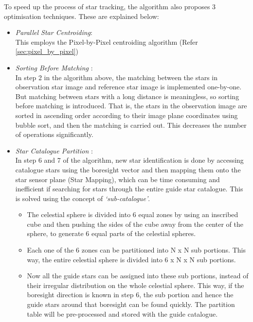 \documentclass[../../main.tex]{subfiles}
\begin{document}
To speed up the process of star tracking, the algorithm also proposes 3 optimisation techniques. These are explained below:
\begin{itemize}
    \item \textit{Parallel Star Centroiding}:\\
    This employs the Pixel-by-Pixel centroiding algorithm (Refer \ref{sec:pixel_by_pixel})
    
    \item \textit{Sorting Before Matching} \label{sorting_before_matching}:\\
    In step 2 in the algorithm above, the matching between the stars in observation star image and reference star image is implemented one-by-one. But matching between stars with a long distance is meaningless, so sorting before matching is introduced. That is, the stars in the observation image are sorted in ascending order according to their image plane coordinates using bubble sort, and then the matching is carried out. This decreases the number of operations significantly. 
    
    \item \textit{Star Catalogue Partition} \label{catalogue_partition}:\\
    In step 6 and 7 of the algorithm, new star identification is done by accessing catalogue stars using the boresight vector and then mapping them onto the star sensor plane (Star Mapping), which can be time consuming and inefficient if searching for stars through the entire guide star catalogue. This is solved using the concept of \textit{`sub-catalogue'}.
    \begin{itemize}
        \item The celestial sphere is divided into 6 equal zones by using an inscribed cube and then pushing the sides of the cube away from the center of the sphere, to generate 6 equal parts of the celestial spheres. 
        \item Each one of the 6 zones can be partitioned into N x N sub portions. This way, the entire celestial sphere is divided into 6 x N x N sub portions. 
        \item Now all the guide stars can be assigned into these sub portions, instead of their irregular distribution on the whole celestial sphere. This way, if the boresight direction is known in step 6, the sub portion and hence the guide stars around that boresight can be found quickly. The partition table will be pre-processed and stored with the guide catalogue. 
    \end{itemize}
\end{itemize}
\end{document}
